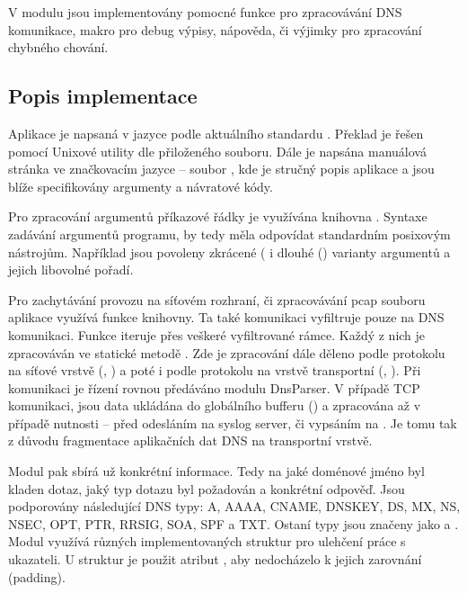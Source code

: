\documentclass[11pt, a4paper, titlepage]{article}
\begin{document}
V modulu  jsou implementovány pomocné funkce pro zpracovávání DNS komunikace, makro pro debug výpisy, nápověda, či výjimky pro zpracování chybného chování.
\bigskip



\subsection{Popis implementace}

Aplikace je napsaná v jazyce  podle aktuálního standardu . Překlad je řešen pomocí Unixové utility  dle přiloženého  souboru. Dále je napsána manuálová stránka ve značkovacím jazyce  -- soubor , kde je stručný popis aplikace a jsou blíže specifikovány argumenty a návratové kódy.
\bigskip

Pro zpracování argumentů příkazové řádky je využívána knihovna . Syntaxe zadávání argumentů programu, by tedy měla odpovídat standardním posixovým nástrojům. Například jsou povoleny zkrácené ( i dlouhé () varianty argumentů a jejich libovolné pořadí.
\bigskip

Pro zachytávání provozu na síťovém rozhraní, či zpracovávání pcap souboru aplikace využívá funkce  knihovny. Ta také komunikaci vyfiltruje pouze na DNS komunikaci. Funkce  iteruje přes veškeré vyfiltrované rámce. Každý z nich je zpracováván ve statické metodě . Zde je zpracování dále děleno podle protokolu na síťové vrstvě (, ) a poté i podle protokolu na vrstvě transportní (, ). Při  komunikaci je řízení rovnou předáváno modulu DnsParser. V případě TCP komunikaci, jsou data ukládána do globálního bufferu () a zpracována až v případě nutnosti -- před odesláním na syslog server, či vypsáním na . Je tomu tak z důvodu fragmentace aplikačních dat DNS na transportní vrstvě.
\bigskip

Modul  pak sbírá už konkrétní informace. Tedy na jaké doménové jméno byl kladen dotaz, jaký typ dotazu byl požadován a konkrétní odpověď. Jsou podporovány následující DNS typy: A, AAAA, CNAME, DNSKEY, DS, MX, NS, NSEC, OPT, PTR, RRSIG, SOA, SPF a TXT. Ostaní typy jsou značeny jako  a . Modul využívá různých implementovaných struktur pro ulehčení práce s ukazateli. U struktur je použit atribut , aby nedocházelo k jejich zarovnání (padding).
\bigskip
\end{document}
